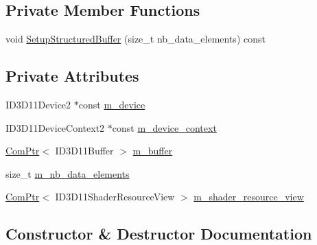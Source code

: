 \subsection*{Private Member Functions}
\begin{DoxyCompactItemize}
\item 
void \hyperlink{structmage_1_1_structured_buffer_a569008d501e11d208288022372df2f48}{Setup\+Structured\+Buffer} (size\+\_\+t nb\+\_\+data\+\_\+elements) const
\end{DoxyCompactItemize}
\subsection*{Private Attributes}
\begin{DoxyCompactItemize}
\item 
I\+D3\+D11\+Device2 $\ast$const \hyperlink{structmage_1_1_structured_buffer_ab1ad27b8053f9631f0a74b9e90aa7d3d}{m\+\_\+device}
\item 
I\+D3\+D11\+Device\+Context2 $\ast$const \hyperlink{structmage_1_1_structured_buffer_a1bdf6ee33d3d53bfd3d5f6191fdbc351}{m\+\_\+device\+\_\+context}
\item 
\hyperlink{namespacemage_ae74f374780900893caa5555d1031fd79}{Com\+Ptr}$<$ I\+D3\+D11\+Buffer $>$ \hyperlink{structmage_1_1_structured_buffer_adbd113ab2fe539e34587887876fe3825}{m\+\_\+buffer}
\item 
size\+\_\+t \hyperlink{structmage_1_1_structured_buffer_a92c53203287f6ef5ab8ed88c7b588e72}{m\+\_\+nb\+\_\+data\+\_\+elements}
\item 
\hyperlink{namespacemage_ae74f374780900893caa5555d1031fd79}{Com\+Ptr}$<$ I\+D3\+D11\+Shader\+Resource\+View $>$ \hyperlink{structmage_1_1_structured_buffer_aa7a7c6da909ae8bed3c408f672a68377}{m\+\_\+shader\+\_\+resource\+\_\+view}
\end{DoxyCompactItemize}


\subsection{Constructor \& Destructor Documentation}
\hypertarget{structmage_1_1_structured_buffer_a9ba747c0666b96c17e3711266ee74aa0}{}\label{structmage_1_1_structured_buffer_a9ba747c0666b96c17e3711266ee74aa0} 

